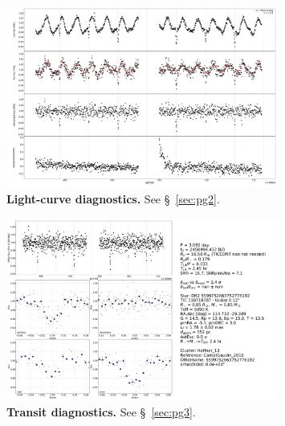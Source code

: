 \documentclass[12pt,twocolumn,tighten]{aastex62}
\begin{document}
\begin{figure}[!h]
	\begin{center}
		\leavevmode
		\includegraphics[width=0.8\textwidth]{gaiatwo0005599752663752776192-0007_page02.pdf}
	\end{center}
	\vspace{-0.5cm}
	\caption{
		{\bf Light-curve diagnostics.} See \S~\ref{sec:pg2}.
		\label{fig:pg2}
	}
\end{figure}

\begin{figure}[!h]
	\begin{center}
		\leavevmode
		\includegraphics[width=0.8\textwidth]{gaiatwo0005599752663752776192-0007_page03.pdf}
	\end{center}
	\vspace{-0.5cm}
	\caption{
    {\bf Transit diagnostics.}  See \S~\ref{sec:pg3}.
		\label{fig:pg3}
	}
\end{figure}
\end{document}
